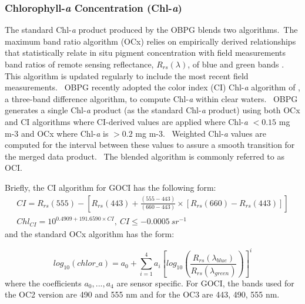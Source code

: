\documentclass[onecolumn,3p,letterpaper,11pt]{elsarticle}
\begin{document}
\subsubsection{Chlorophyll-{\it a} Concentration (Chl-{\it a})}
The standard Chl-{\it a} product produced by the OBPG blends two algorithms. The maximum band ratio algorithm (OCx) relies on empirically derived relationships that statistically relate in situ pigment concentration with field measurements band ratios of remote sensing reflectance, $R_{rs}(\lambda)$, of blue and green bands \citep{OReilly1998_Chl}.  This algorithm is updated regularly to include the most recent field measurements.  OBPG recently adopted the color index (CI) Chl-{\it a} algorithm of \citet{Hu2012}, a three-band difference algorithm, to compute Chl-{\it a} within clear waters.  OBPG generates a single Chl-{\it a} product (as the standard Chl-{\it a} product) using both OCx and CI algorithms where CI-derived values are applied where Chl-{\it a} $<0.15$ mg m-3 and OCx where Chl-{\it a} is $>0.2$ mg m-3.  Weighted Chl-{\it a} values are computed for the interval between these values to assure a smooth transition for the merged data product.  The blended algorithm is commonly referred to as OCI.


Briefly, the CI algorithm for GOCI has the following form:
\begin{equation}
\begin{split}
  CI=R_{rs}(555)-\left[R_{rs}(443)+\frac{(555-443)}{(660-443)}\times [R_{rs}(660)-R_{rs}(443)]\right]\\
  Chl_{CI} = 10^{0.4909+191.6590\times CI},~CI\leq-0.0005~sr^{-1}
\end{split}  
\end{equation}
\noindent and the standard OCx algorithm has the form: 

\begin{equation}
  log_{10}(chlor\_a) = a_0 + \sum_{i=1}^4 a_i \left[log_{10}\left(\frac{R_{rs}(\lambda_{blue})}{R_{rs}(\lambda_{green})}\right)\right]^i
\end{equation}
where the coefficients $a_0,...,a_4$ are sensor specific. For GOCI, the bands used for the OC2 version are 490 and 555 nm and for the OC3 are 443, 490, 555 nm.
\end{document}
